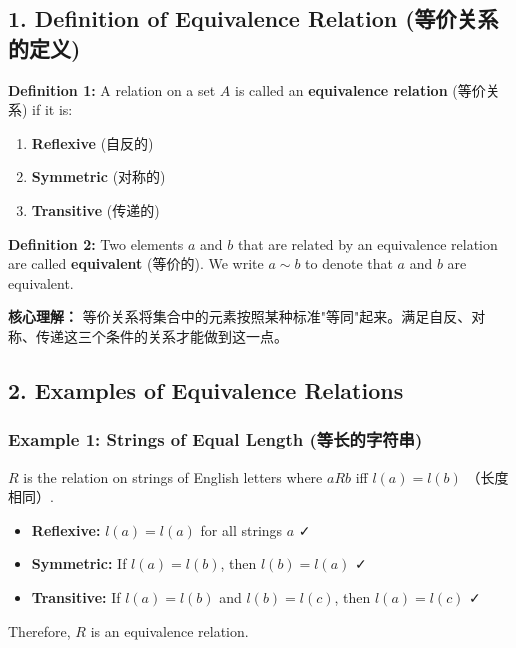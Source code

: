 \documentclass[10pt,a4paper,openany]{ctexbook}
\theoremstyle{definition}
\theoremstyle{remark}
\renewenvironment{quote}
  {\list{}{\leftmargin=1em\rightmargin=0pt\topsep=0.5pt\partopsep=0pt}\item[]}
  {\endlist}
\begin{document}
\vspace{-2pt}

\subsection{1. Definition of Equivalence Relation (等价关系的定义)}

\textbf{Definition 1:} A relation on a set $A$ is called an \textbf{equivalence relation} (等价关系) if it is:
\begin{enumerate}
\item \textbf{Reflexive} (自反的)
\item \textbf{Symmetric} (对称的)
\item \textbf{Transitive} (传递的)

\end{enumerate}

\textbf{Definition 2:} Two elements $a$ and $b$ that are related by an equivalence relation are called \textbf{equivalent} (等价的). We write $a \sim b$ to denote that $a$ and $b$ are equivalent.
\begin{quote}
\textbf{核心理解：} 等价关系将集合中的元素按照某种标准"等同"起来。满足自反、对称、传递这三个条件的关系才能做到这一点。

\end{quote}
\vspace{-2pt}

\subsection{2. Examples of Equivalence Relations}

\subsubsection{Example 1: Strings of Equal Length (等长的字符串)}

$R$ is the relation on strings of English letters where $aRb$ iff $l(a) = l(b)$ （长度相同）.
\begin{itemize}
\item \textbf{Reflexive:} $l(a) = l(a)$ for all strings $a$ ✓
\item \textbf{Symmetric:} If $l(a) = l(b)$, then $l(b) = l(a)$ ✓
\item \textbf{Transitive:} If $l(a) = l(b)$ and $l(b) = l(c)$, then $l(a) = l(c)$ ✓

\end{itemize}

Therefore, $R$ is an equivalence relation.
\end{document}
